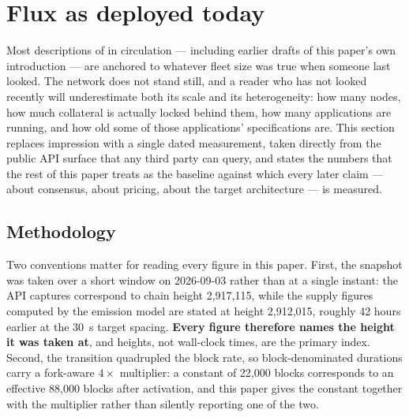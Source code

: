 \section{Flux as deployed today}
\label{sec:deployed-today}\label{sec:baseline}

Most descriptions of \Flux in circulation — including earlier drafts of this paper's own
introduction — are anchored to whatever fleet size was true when someone last looked. The network
does not stand still, and a reader who has not looked recently will underestimate both its scale
and its heterogeneity: how many nodes, how much collateral is actually locked behind them, how many
applications are running, and how old some of those applications' specifications are. This section
replaces impression with a single dated measurement, taken directly from the public API surface
that any third party can query, and states the numbers that the rest of this paper treats as the
baseline against which every later claim — about consensus, about pricing, about the target
architecture — is measured.

\subsection{Methodology}
\label{sec:deployed-today-methodology}

Two conventions matter for reading every figure in this paper. First, the snapshot was taken over a
short window on 2026-09-03 rather than at a single instant: the API captures correspond to chain
height 2{,}917{,}115, while the supply figures computed by the emission model are stated at height
2{,}912{,}015, roughly 42 hours earlier at the \SI{30}{\second} target spacing. \textbf{Every figure
therefore names the height it was taken at}, and heights, not wall-clock times, are the primary
index. Second, the \PoN transition quadrupled the block rate, so block-denominated durations carry a
fork-aware $4\times$ multiplier: a constant of 22{,}000 blocks corresponds to an effective
88{,}000 blocks after activation, and this paper gives the constant together with the multiplier
rather than silently reporting one of the two.


